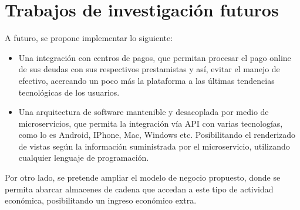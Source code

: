 \section{Trabajos de investigación futuros}

	{A futuro, se propone implementar lo siguiente:
		
	\begin{itemize}
		\item Una integración con centros de pagos, que permitan procesar el pago online de sus deudas con sus respectivos prestamistas y así, evitar el manejo de efectivo, acercando un poco más la plataforma a las últimas tendencias tecnológicas de los usuarios.
		
		\item Una arquitectura de software mantenible y desacoplada por medio de microservicios, que permita la integración vía API con varias tecnologías, como lo es Android, IPhone, Mac, Windows etc. Posibilitando el renderizado de vistas según la información suministrada por el microservicio, utilizando cualquier lenguaje de programación.
	\end{itemize}
		
	Por otro lado, se pretende ampliar el modelo de negocio propuesto, donde se permita abarcar almacenes de cadena que accedan a este tipo de actividad económica, posibilitando un ingreso económico extra.
	}
\clearpage